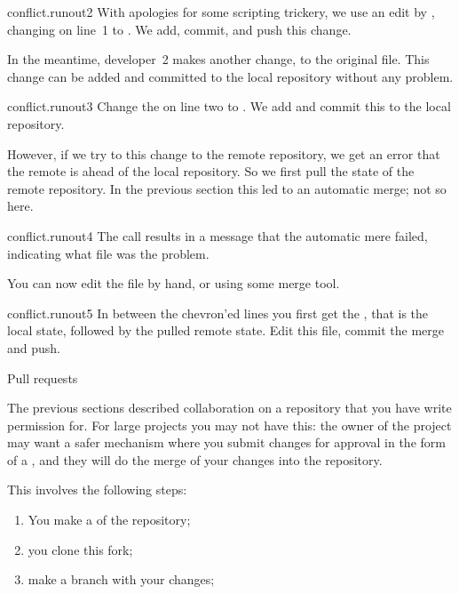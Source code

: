 \begin{gitstep}{conflict.runout2}
  With apologies for some scripting trickery,
  we use an edit by , changing  on line~1 to .
  We add, commit, and push this change.
\end{gitstep}

In the meantime, developer~2 makes another change, to the original file.
This change can be added and committed to the local repository
without any problem.

\begin{gitstep}{conflict.runout3}
  Change the  on line two to .
  We add and commit this to the local repository.
\end{gitstep}

However, if we try to  this change to the remote repository,
we get an error that the remote is ahead of the local repository.
So we first pull the state of the remote repository.
In the previous section this led to an automatic merge;
not so here.

\begin{gitstep}{conflict.runout4}
  The  call results in a message that the automatic mere failed,
  indicating what file was the problem.
\end{gitstep}

You can now edit the file by hand, or using some merge tool.

\begin{gitstep}{conflict.runout5}
  In between the chevron'ed lines you first get the ,
  that is the local state, followed by the pulled remote state.
  Edit this file, commit the merge and push.
\end{gitstep}

 {Pull requests}

The previous sections described collaboration on a repository
that you have write permission for.
For large projects you may not have this:
the owner of the project may want a safer mechanism
where you submit changes for approval
in the form of a , and
they will do the merge of your changes into the repository.

This involves the following steps:
\begin{enumerate}
\item You make a  of the repository;
\item you clone this fork;
\item make a branch with your changes;
\end{enumerate}

